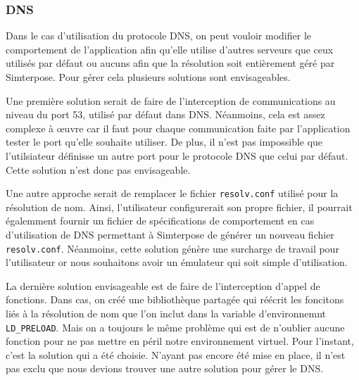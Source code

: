 \subsubsection{DNS}

Dans le cas d'utilisation du protocole DNS, on peut vouloir modifier le
comportement de l'application afin qu'elle utilise d'autres serveurs que ceux
utilisés par défaut ou aucuns afin que la résolution soit entièrement géré par
Simterpose. Pour gérer cela plusieurs solutions sont envisageables.

Une première solution serait de faire de l'interception de communications au
niveau du port 53, utilisé par défaut dans DNS. Néanmoins, cela est assez
complexe à \oe uvre car il faut pour chaque communication faite par
l'application tester le port qu'elle souhaite utiliser. De plus, il n'est pas
impossible que l'utilsiateur définisse un autre port pour le protocole DNS que
celui par défaut. Cette solution n'est donc pas envisageable.

Une autre approche serait de remplacer le fichier \texttt{resolv.conf} utilisé
pour la résolution de nom. Ainsi, l'utilisateur configurerait son propre
fichier, il pourrait égalemment fournir un fichier de spécifications de
comportement en cas d'utilisation de DNS permettant à Simterpose de générer un
nouveau fichier \texttt{resolv.conf}. Néanmoins, cette solution génère une
surcharge de travail pour l'utilisateur or nous souhaitons avoir un émulateur
qui soit simple d'utilisation.

La dernière solution envisageable est de faire de l'interception d'appel de
fonctions. Dans cas, on créé une bibliothèque partagée qui réécrit les foncitons
liés à la résolution de nom que l'on inclut dans la variable d'environnemnt
\texttt{LD\_PRELOAD}. Mais on a toujours le même problème qui est de n'oublier
aucune fonction pour ne pas mettre en péril notre environnement virtuel. Pour
l'instant, c'est la solution qui a été choisie. N'ayant pas encore été mise en
place, il n'est pas exclu que nous devions trouver une autre solution pour gérer
le DNS.

\vspace{0.5cm}

